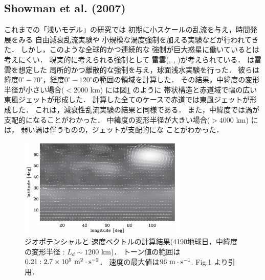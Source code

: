 \documentclass[a4j,12pt,openbib,oneside]{jreport}
\begin{document}
\subsection{Showman et al. (2007)}
\label{sec:intro21}
これまでの「浅いモデル」の研究では
初期に小スケールの乱流を与え，時間発展をみる
自由減衰乱流実験\citep{Yoden1993}や
小規模な渦度強制を加える実験\citep{Scott2007}などが行われてきた．
%
しかし，このような全球的かつ連続的な
強制が巨大惑星に働いているとは考えにくい．
%
現実的に考えられる強制として
雷雲(\cite{Gierasch2000}, \cite{Porco2005}, \cite{Ingersoll2000})が考えられている．
%
\cite{Showman2007}は雷雲を想定した
局所的かつ離散的な強制を与え，球面浅水実験を行った．
彼らは緯度$0^\circ - 70^\circ$，経度$0^\circ - 120^\circ$の範囲の領域を計算した．
その結果，中緯度の変形半径が小さい場合($< 2000$ km) には図\ref{fig3} のように
帯状構造と赤道域で幅の広い東風ジェットが形成した．
計算した全てのケースで赤道では東風ジェットが形成した．
これは，減衰性乱流実験の結果と同様である\citep{Cho1996}．
また，中緯度では渦が支配的になることがわかった．
%
中緯度の変形半径が大きい場合($> 4000$ km) には，
弱い渦は伴うものの，ジェットが支配的にな
ことがわかった．
%
%
\begin{figure}[H]
  \begin{center}
    \includegraphics[clip,width=8cm]{./fig/intro/fig3.png}
    \caption{
      \footnotesize{ジオポテンシャルと
速度ベクトルの計算結果(4190地球日，中緯度の変形半径 : $L_d \sim 1200$ km)．
トーン値の範囲は$0.21 : 2.7 \times 10^5 \rm{~m^2 \cdot s^{-2}}$．
速度の最大値は$96 \rm{~m \cdot s^{-1}}$.
\cite{Showman2007} Fig.1 より引用．
      }
    }
    \label{fig3}
  \end{center}
\end{figure}
%
\end{document}

